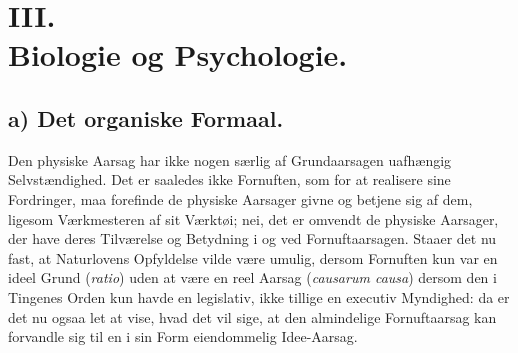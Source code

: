 \documentclass[11pt]{book}
\newcommand{\opage}[1]{\marginnote{\footnotesize\textit{[#1]}}}
\begin{document}
\part*{III.\\ Biologie og Psychologie.}

\chapter*{a) Det organiske Formaal.}

\opage{277} \setcounter{footnote}{0}%
Den physiske Aarsag har ikke nogen særlig af Grundaarsagen uafhængig
Selvstændighed. Det er saaledes ikke Fornuften, som for at realisere sine
Fordringer, maa forefinde de physiske Aarsager givne og betjene sig af dem,
ligesom Værkmesteren af sit Værktøi; nei, det er omvendt de physiske
Aarsager, der have deres Tilværelse og Betydning i og ved Fornuftaarsagen.
Staaer det nu fast, at Naturlovens Opfyldelse vilde være umulig, dersom
Fornuften kun var en ideel Grund (\textit{ratio}) uden at være en reel Aarsag
(\textit{causarum causa}) dersom den i Tingenes Orden kun havde en
legislativ, ikke tillige en executiv Myndighed: da er det nu ogsaa let at
vise, hvad det vil sige, at den almindelige Fornuftaarsag kan forvandle sig
til en i sin Form eiendommelig Idee-Aarsag.
\end{document}

